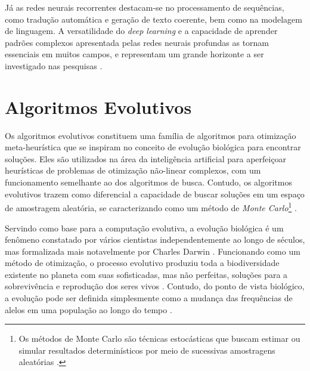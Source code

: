 \documentclass[
	12pt,				%
	openright,			%
	twoside,			%
	a4paper,			%
	tcc,			%
	]{ABNT-DC-UEL}
\begin{document}
Já as redes neurais recorrentes destacam-se no processamento de sequências, como tradução automática e geração de texto coerente, bem como na modelagem de linguagem. A versatilidade do \textit{deep learning} e a capacidade de aprender padrões complexos apresentada pelas redes neurais profundas as tornam essenciais em muitos campos, e representam um grande horizonte a ser investigado nas pesquisas \cite{sharma:21}.

\section{Algoritmos Evolutivos}

Os algoritmos evolutivos constituem uma família de algoritmos para otimização meta-heurística que se inspiram no conceito de evolução biológica para encontrar soluções. Eles são utilizados na área da inteligência artificial para aperfeiçoar heurísticas de problemas de otimização não-linear complexos, com um funcionamento semelhante ao dos algoritmos de busca. Contudo, os algoritmos evolutivos trazem como diferencial a capacidade de buscar soluções em um espaço de amostragem aleatória, se caracterizando como um método de \textit{Monte Carlo}\footnote[1]{Os métodos de Monte Carlo são técnicas estocásticas que buscam estimar ou simular resultados determinísticos por meio de sucessivas amostragens aleatórias \cite{russell:21}.} \cite{ashlock:06}. %

Servindo como base para a computação evolutiva, a evolução biológica é um fenômeno constatado por vários cientistas independentemente ao longo de séculos, mas formalizada mais notavelmente por Charles Darwin \cite{darwin:59}. Funcionando como um método de otimização, o processo evolutivo produziu toda a biodiversidade existente no planeta com suas sofisticadas, mas não perfeitas, soluções para a sobrevivência e reprodução dos seres vivos \cite{back:00}. Contudo, do ponto de vista biológico, a evolução pode ser definida simplesmente como a mudança das frequências de alelos em uma população ao longo do tempo \cite{ashlock:06}.
\end{document}
